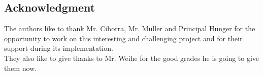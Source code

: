 \subsection{Acknowledgment}
The authors like to thank Mr. Ciborra, Mr. M\"uller and Principal Hunger 
for the opportunity to work on this interesting and challenging project 
and for their support during its implementation.\\
They also like to give thanks to Mr. Weihe for the good grades he is going 
to give them now.








